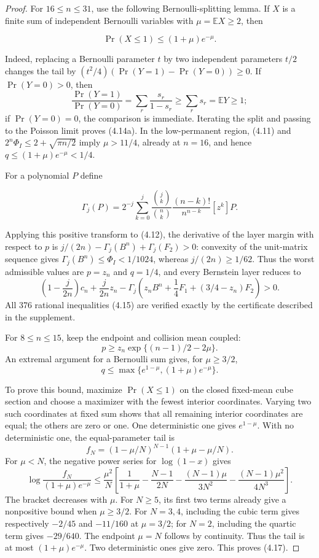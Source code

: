 \documentclass[11pt]{article}
\begin{document}
\begin{proof}
For $16\le n\le31$, use the following Bernoulli-splitting lemma.  If
$X$ is a finite sum of independent Bernoulli variables with
$\mu=\mathbb EX\ge2$, then

\[
 \Pr(X\le1)\le(1+\mu)e^{-\mu}. \tag{4.14a}
\]

Indeed, replacing a Bernoulli parameter $t$ by two independent parameters
$t/2$ changes the tail by
$(t^2/4)(\Pr(Y=1)-\Pr(Y=0))\ge0$.  If $\Pr(Y=0)>0$, then
\[
 \frac{\Pr(Y=1)}{\Pr(Y=0)}=
 \sum_r\frac{s_r}{1-s_r}\ge\sum_rs_r=\mathbb EY\ge1;
\]
if $\Pr(Y=0)=0$, the comparison is immediate.  Iterating the split and
passing to the Poisson limit proves
(4.14a).  In the low-permanent region, (4.11) and
$2^n\Phi_I\le2+\sqrt{\pi n/2}$ imply
$\mu>11/4$, already at $n=16$, and hence
$q\le(1+\mu)e^{-\mu}<1/4$.

For a polynomial $P$ define

\[
 \Gamma_j(P)=2^{-j}\sum_{k=0}^j
 \frac{\binom jk}{\binom nk}\frac{(n-k)!}{n^{n-k}}[z^k]P.
\]

Applying this positive transform to (4.12), the derivative of the layer
margin with respect to $p$ is
$j/(2n)-\Gamma_j(B^n)+\Gamma_j(F_2)>0$: convexity of the unit-matrix
sequence gives $\Gamma_j(B^n)\le\Phi_I<1/1024$, whereas
$j/(2n)\ge1/62$.  Thus the worst admissible values are
$p=z_n$ and $q=1/4$, and every Bernstein layer reduces to
\[
\left(1-\frac{j}{2n}\right)c_n+\frac{j}{2n}z_n
-\Gamma_j\!\left(z_nB^n+\frac14F_1+
  (3/4-z_n)F_2\right)>0. \tag{4.15}
\]
All 376 rational inequalities (4.15) are verified exactly by the certificate
described in the supplement.

For $8\le n\le15$, keep the endpoint and collision mean coupled:
\[
p\ge z_n\exp\{(n-1)/2-2\mu\}. \tag{4.16}
\]
An extremal argument for a Bernoulli sum gives, for $\mu\ge3/2$,
\[
q\le\max\{e^{1-\mu},(1+\mu)e^{-\mu}\}. \tag{4.17}
\]

To prove this bound, maximize $\Pr(X\le1)$ on the closed fixed-mean
cube section and choose a maximizer with the fewest interior coordinates.
Varying two such coordinates at fixed sum shows that all remaining interior
coordinates are equal; the others are zero or one.  One deterministic one
gives $e^{1-\mu}$.  With no deterministic one, the equal-parameter
tail is
\[
 f_N=(1-\mu/N)^{N-1}(1+\mu-\mu/N).
\]
For $\mu<N$, the negative power series for $\log(1-x)$ gives
\[
 \log\frac{f_N}{(1+\mu)e^{-\mu}}
 \le\frac{\mu^2}{N}\left[
 \frac1{1+\mu}-\frac{N-1}{2N}
 -\frac{(N-1)\mu}{3N^2}
 -\frac{(N-1)\mu^2}{4N^3}\right]. \tag{4.17a}
\]
The bracket decreases with $\mu$.  For $N\ge5$, its first two terms
already give a nonpositive bound when $\mu\ge3/2$.  For $N=3,4$,
including the cubic term gives respectively $-2/45$ and $-11/160$ at
$\mu=3/2$; for $N=2$, including the quartic term gives $-29/640$.
The endpoint $\mu=N$ follows by continuity.  Thus the tail is at most
$(1+\mu)e^{-\mu}$.  Two
deterministic ones give zero.  This proves (4.17).


\end{proof}
\end{document}
